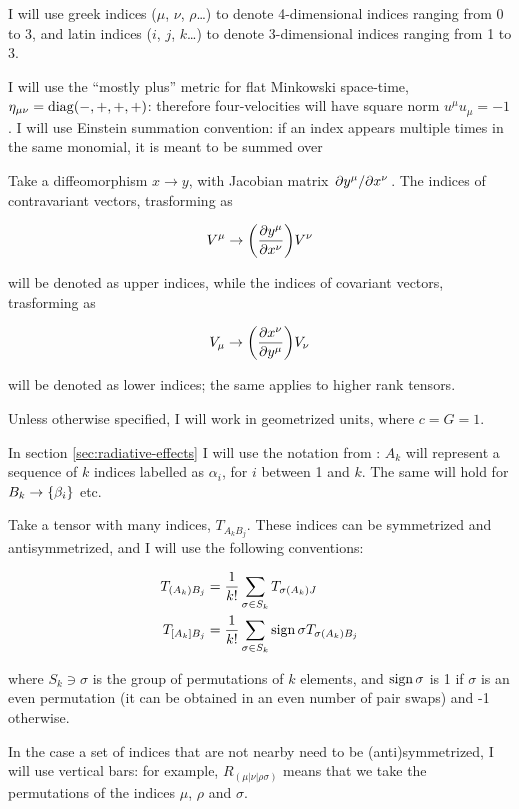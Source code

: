 \documentclass[main.tex]{subfiles}
\begin{document}
I will use greek indices ($\mu$, $\nu$, $\rho$\dots) to denote 4-dimensional indices ranging from 0 to 3, and latin indices ($i$, $j$, $k$\dots) to denote 3-dimensional indices ranging from 1 to 3.

I will use the ``mostly plus'' metric for flat Minkowski space-time, $\eta_{\mu \nu} = \operatorname{diag}(-, +, +, +)$: therefore four-velocities will have square norm \(u^\mu u_\mu = -1\).
I will use Einstein summation convention: if an index appears multiple times in the same monomial, it is meant to be summed over

Take a diffeomorphism $x \rightarrow y$, with Jacobian matrix $\pdv*{y^\mu}{x^\nu}$.
The indices of contravariant vectors, trasforming as

\begin{equation}
    V^\mu \rightarrow \qty( \pdv{y^\mu}{x^\nu})  V^\nu
\end{equation}

will be denoted as upper indices, while the indices of covariant vectors, trasforming as

\begin{equation}
V_\mu \rightarrow \qty( \pdv{x^\nu}{y^\mu})  V_\nu
\end{equation}

will be denoted as lower indices; the same applies to higher rank tensors.

Unless otherwise specified, I will work in geometrized units, where $c = G = 1$.

In section \ref{sec:radiative-effects} I will use the notation from \textcite[]{Thorne:1981feb}: \(A_k\) will represent a sequence of \(k\) indices labelled as \(\alpha_i\), for \(i\) between 1 and \(k\). The same will hold for \(B_k \rightarrow \qty{\beta_i}\) etc.

Take a tensor with many indices, \(T_{A_k B_j}\). These indices can be symmetrized and antisymmetrized, and I will use the following conventions:

\begin{align}
    T_{(A_k) B_j } &= \frac{1}{k!} \sum_{\sigma \in S_k} T_{\sigma(A_k)J} \\
    T_{[A_k]B_j} &= \frac{1}{k!} \sum_{\sigma \in S_k} \sign{\sigma} T_{\sigma(A_k)B_j}
\end{align}

where \(S_k \ni \sigma \) is the group of permutations of $k$ elements, and $\operatorname{sign}{\sigma}$ is 1 if $\sigma$ is an even permutation (it can be obtained in an even number of pair swaps) and -1 otherwise.

In the case a set of indices that are not nearby need to be (anti)symmetrized, I will use vertical bars: for example, \(R_{(\mu | \nu| \rho \sigma)}\) means that we take the permutations of the indices \(\mu\), \(\rho\) and \(\sigma\). 
\end{document}
